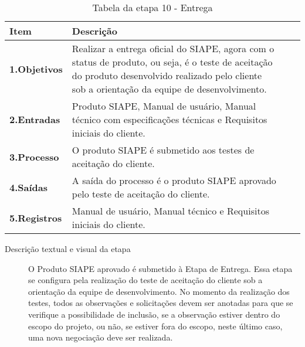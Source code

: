\begin{table}[htbp]
	\centering
	\caption{Tabela da etapa 10 - Entrega}
	\begin{tabular}{|l| p{13.5cm}| c| c| } \hline
		\textbf{Item} 	    & \textbf{Descrição} 
		\\ \hline
		\textbf{1.Objetivos}	   &  
		Realizar a entrega oficial do SIAPE, agora com o status de produto, ou seja, é o teste de aceitação do produto desenvolvido realizado pelo cliente sob a orientação da equipe de desenvolvimento. 
		\\ \hline
		\textbf{2.Entradas}	  &		
      
		Produto SIAPE,  Manual de usuário, Manual técnico com especificações técnicas e Requisitos iniciais do cliente. 
		\\ \hline	
		\textbf{3.Processo}     &
		O produto SIAPE é submetido aos testes de aceitação do cliente.
		\\ \hline
		\textbf{4.Saídas}		& 
		A saída do processo é o produto SIAPE aprovado pelo teste de aceitação do cliente.
		\\ \hline
		\textbf{5.Registros}   & 	
		Manual de usuário, Manual técnico e Requisitos iniciais do cliente.
		\\ \hline
		
		\end{tabular}
	\label{T12}\par
\end{table}


\begin{description}
	
\item[Descrição textual e visual da etapa]
O Produto SIAPE aprovado é submetido à Etapa de Entrega. Essa etapa se configura pela realização do teste de aceitação do cliente sob a orientação da equipe de desenvolvimento. No momento da realização dos testes, todos as observações e solicitações devem ser anotadas para que se verifique a possibilidade de inclusão, se a observação estiver dentro do escopo do projeto, ou não, se estiver fora do escopo, neste último caso, uma nova negociação deve ser realizada.    

\end{description}

